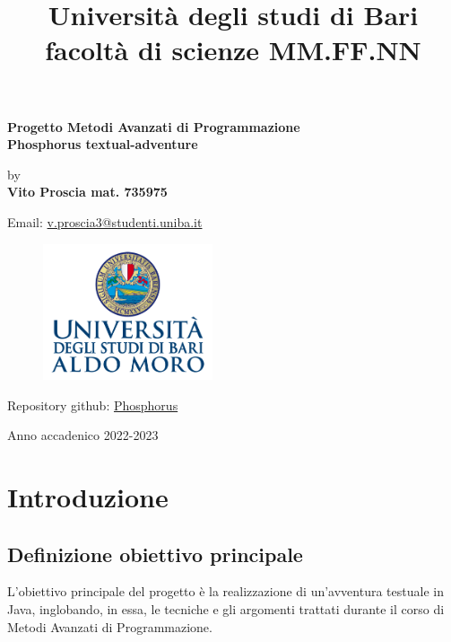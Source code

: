 \documentclass[italian,12pt,a4paper]{article}
\title{Università degli studi di Bari facoltà di scienze MM.FF.NN}
\date{} %
\begin{document}
	\maketitle
	\thispagestyle{empty}
	\begin{center}
		\huge	\textbf{Progetto Metodi Avanzati di Programmazione} \\
		\vspace{20px}
		\Large \textbf{Phosphorus textual-adventure}
	\end{center}
	
	\begin{center}
		by \\
		\Large \textbf{Vito Proscia mat. 735975} \\
	\end{center}
	\vspace{5px}
	\begin{center}
		Email: \href{mailto:v.proscia3@studenti.uniba.it}{v.proscia3@studenti.uniba.it}
	\end{center}
	\vspace{30px}
	\begin{figure}[hb]
		\centering
		\includegraphics[width=5cm]{image.png}
	\end{figure}
	\vspace{50px}
	\begin{center}
		Repository github: \href{https://github.com/Giut0/Phosphorus-textual-adventure}{Phosphorus}
	\end{center}
	
	\vfill
	\begin{center}
		Anno accadenico 2022-2023
	\end{center}
	
	\newpage
	
	\tableofcontents
	
	\newpage
	
	\section{Introduzione}
	\subsection{Definizione obiettivo principale}
	L'obiettivo principale del progetto è la realizzazione di un'avventura testuale in Java, inglobando, in essa, le tecniche e gli argomenti trattati durante il corso di Metodi Avanzati di Programmazione.
\end{document}
